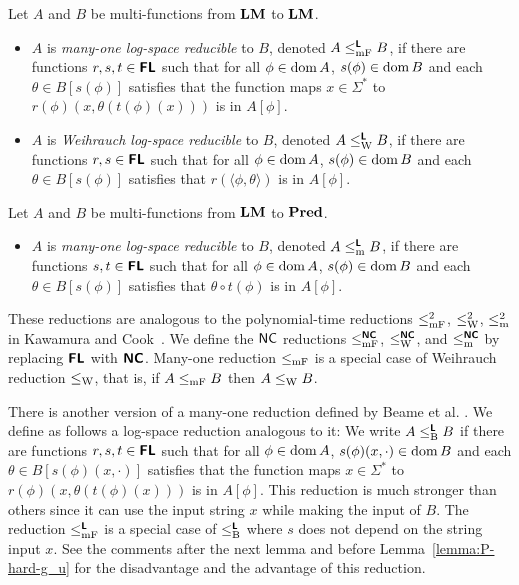 \documentclass[envcountsame,orivec,oribibl]{llncs}
\begin{document}
\begin{definition}
Let $A$ and $B$ be multi-functions from $\mathbf{LM}$ to $\mathbf{LM}$.
\begin{itemize}
 \item $A$ is \emph{many-one log-space reducible} to $B$, 
       denoted $A \leq _{\mathrm{mF}} ^{\text{\bfseries \sffamily \upshape L}} B$,
       if there are functions $r, s, t \in \text{\bfseries \sffamily \upshape FL}$ such that 
       for all $\phi \in \mathop{\rm dom} A$,
       $s(\phi) \in \mathop{\rm dom} B$ and each $\theta \in B[s(\phi)]$ satisfies that
       the function maps $x \in \Sigma^*$ to $r(\phi)(x, \theta(t(\phi)(x)))$
       is in $A[\phi]$.
 \item $A$ is \emph{Weihrauch log-space reducible} to $B$,
       denoted $A \leq _{\mathrm W} ^{\text{\bfseries \sffamily \upshape L}} B$,
       if there are functions $r, s \in \text{\bfseries \sffamily \upshape FL}$ such that 
       for all $\phi \in \mathop{\rm dom} A$,
       $s(\phi) \in \mathop{\rm dom} B$ and each $\theta \in B[s(\phi)]$ satisfies that
       $r(\langle \phi, \theta \rangle)$ is in $A[\phi]$.
\end{itemize}
Let $A$ and $B$ be multi-functions from $\mathbf{LM}$ to $\mathbf{Pred}$.
\begin{itemize}
 \item $A$ is \emph{many-one log-space reducible} to $B$, denoted 
       $A \leq _{\mathrm{m}} ^{\text{\bfseries \sffamily \upshape L}} B$, if there are functions $s, t \in \text{\bfseries \sffamily \upshape FL}$ such that 
       for all $\phi \in \mathop{\rm dom} A$, $s(\phi) \in \mathop{\rm dom} B$ and each 
       $\theta \in B[s(\phi)]$ satisfies that $\theta \circ t(\phi)$ is in $A[\phi]$.
\end{itemize} 
\end{definition}

These reductions are analogous to the polynomial-time reductions 
$\leq _{\mathrm{mF}}^2$, $\leq _{\mathrm W}^2$, $\leq _{\mathrm{m}}^2$ in Kawamura and Cook~\cite{kawamura2012complexity}.
We define the $\mathsf{NC}$ reductions $\leq _{\mathrm{mF}}^{\text{\bfseries \sffamily \upshape NC}}$, $\leq _{\mathrm W}^{\text{\bfseries \sffamily \upshape NC}}$,
and $\leq _{\mathrm{m}}^{\text{\bfseries \sffamily \upshape NC}}$ by replacing $\text{\bfseries \sffamily \upshape FL}$ with $\text{\bfseries \sffamily \upshape NC}$.
Many-one reduction $\leq _{\mathrm{mF}}$ is a special case of Weihrauch reduction $\leq _{\mathrm W}$,
that is, if $A \leq _{\mathrm{mF}} B$ then $A \leq _{\mathrm W} B$.

There is another version of a many-one reduction defined by
Beame et al. \cite{beame1995relative}.
We define as follows a log-space reduction analogous to it:
We write $A \leq _{\mathrm B} ^{\text{\bfseries \sffamily \upshape L}} B$ 
if there are functions $r, s, t \in \text{\bfseries \sffamily \upshape FL}$ such that 
for all $\phi \in \mathop{\rm dom} A$,
$s(\phi)(x, \cdot) \in \mathop{\rm dom} B$ and each $\theta \in B[s(\phi)(x, \cdot)]$ 
satisfies that the function maps $x \in \Sigma^*$ 
to $r(\phi)(x, \theta(t(\phi)(x)))$ is in $A[\phi]$.
This reduction is much stronger than others since
it can use the input string $x$ while making the input of $B$.
The reduction $\leq _{\mathrm{mF}} ^{\text{\bfseries \sffamily \upshape L}}$ is a special case of $\leq _{\mathrm B} ^{\text{\bfseries \sffamily \upshape L}}$ where
$s$ does not depend on the string input $x$.
See the comments after the next lemma and before Lemma~\ref{lemma:P-hard-g_u} for
the disadvantage and the advantage of this reduction.
\end{document}
